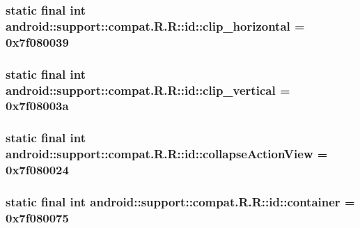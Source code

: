 \hypertarget{classandroid_1_1support_1_1compat_1_1_r_1_1id_1adbbaa031090e9011ef524148348978}{
\subsubsection[{clip\_\-horizontal}]{\setlength{\rightskip}{0pt plus 5cm}static final int android::support::compat.R.R::id::clip\_\-horizontal = 0x7f080039}}
\label{classandroid_1_1support_1_1compat_1_1_r_1_1id_1adbbaa031090e9011ef524148348978}


\hypertarget{classandroid_1_1support_1_1compat_1_1_r_1_1id_cc54157699dba68da9f56265222aa61c}{
\subsubsection[{clip\_\-vertical}]{\setlength{\rightskip}{0pt plus 5cm}static final int android::support::compat.R.R::id::clip\_\-vertical = 0x7f08003a}}
\label{classandroid_1_1support_1_1compat_1_1_r_1_1id_cc54157699dba68da9f56265222aa61c}


\hypertarget{classandroid_1_1support_1_1compat_1_1_r_1_1id_72ed3bb8efe2678c45e6e298b931d047}{
\subsubsection[{collapseActionView}]{\setlength{\rightskip}{0pt plus 5cm}static final int android::support::compat.R.R::id::collapseActionView = 0x7f080024}}
\label{classandroid_1_1support_1_1compat_1_1_r_1_1id_72ed3bb8efe2678c45e6e298b931d047}


\hypertarget{classandroid_1_1support_1_1compat_1_1_r_1_1id_546139d862a94d791f5187fdf2b1b26e}{
\subsubsection[{container}]{\setlength{\rightskip}{0pt plus 5cm}static final int android::support::compat.R.R::id::container = 0x7f080075}}
\label{classandroid_1_1support_1_1compat_1_1_r_1_1id_546139d862a94d791f5187fdf2b1b26e}


